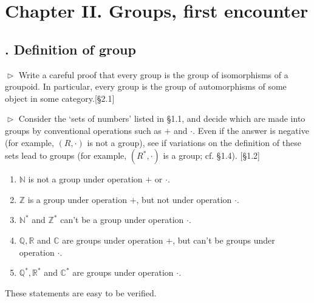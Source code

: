 \section{Chapter II.\hspace{0.2em} Groups, first encounter}

\subsection{. Definition of group}

\begin{problem}[1.1]
$\vartriangleright$ Write a careful proof that every group is the group of isomorphisms of a
groupoid. In particular, every group is the group of automorphisms of some object
in some category.[\S 2.1]
\end{problem}

\begin{solution}

\end{solution}

\begin{problem}[1.2]
$\vartriangleright$ Consider the `sets of numbers' listed in \S 1.1, and decide which are made into
groups by conventional operations such as $+$ and $\cdot$. Even if the answer is negative
(for example, $(R, \cdot)$ is not a group), see if variations on the definition of these sets
lead to groups (for example, $(R^{\ast}, \cdot)$ is a group; cf. \S 1.4). [\S 1.2]
\end{problem}

\begin{solution}
\begin{enumerate}
\item $\mathbb{N}$ is not a group under operation $+$ or $\cdot$.
\item $\mathbb{Z}$ is a group under operation $+$, but not under operation $\cdot$.
\item $\mathbb{N}^{\ast}$ and $\mathbb{Z}^{\ast}$ can't be a group under operation $\cdot$.
\item $\mathbb{Q}, \mathbb{R}$ and $\mathbb{C}$ are groups under operation $+$, but can't be groups under operation $\cdot$.
\item $\mathbb{Q}^{\ast}, \mathbb{R}^{\ast}$ and $\mathbb{C}^{\ast}$ are groups under operation $\cdot$.
\end{enumerate}
These statements are easy to be verified. 
\end{solution}

